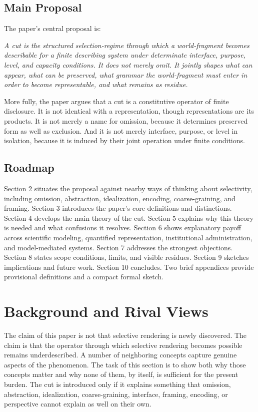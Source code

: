 \documentclass[11pt]{article}
\renewenvironment{quote}
  {\list{}{\leftmargin=1.4em \rightmargin=1.0em}%
   \item\relax\color{softink}\itshape}
  {\endlist}
\begin{document}
\subsection{Main Proposal}

The paper's central proposal is:

\begin{quote}
A cut is the structured selection-regime through which a world-fragment becomes describable for a finite describing system under determinate interface, purpose, level, and capacity conditions. It does not merely omit. It jointly shapes what can appear, what can be preserved, what grammar the world-fragment must enter in order to become representable, and what remains as residue.
\end{quote}

More fully, the paper argues that a cut is a constitutive operator of finite disclosure. It is not identical with a representation, though representations are its products. It is not merely a name for omission, because it determines preserved form as well as exclusion. And it is not merely interface, purpose, or level in isolation, because it is induced by their joint operation under finite conditions.

\subsection{Roadmap}

Section 2 situates the proposal against nearby ways of thinking about selectivity, including omission, abstraction, idealization, encoding, coarse-graining, and framing. Section 3 introduces the paper's core definitions and distinctions. Section 4 develops the main theory of the cut. Section 5 explains why this theory is needed and what confusions it resolves. Section 6 shows explanatory payoff across scientific modeling, quantified representation, institutional administration, and model-mediated systems. Section 7 addresses the strongest objections. Section 8 states scope conditions, limits, and visible residues. Section 9 sketches implications and future work. Section 10 concludes. Two brief appendices provide provisional definitions and a compact formal sketch.
\section{Background and Rival Views}

The claim of this paper is not that selective rendering is newly discovered. The claim is that the operator through which selective rendering becomes possible remains underdescribed. A number of neighboring concepts capture genuine aspects of the phenomenon. The task of this section is to show both why those concepts matter and why none of them, by itself, is sufficient for the present burden. The cut is introduced only if it explains something that omission, abstraction, idealization, coarse-graining, interface, framing, encoding, or perspective cannot explain as well on their own.
\end{document}
